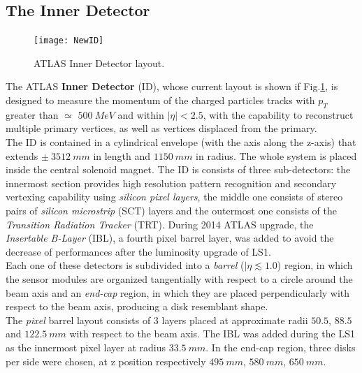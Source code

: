 \documentclass[a4paper,twoside,12pt]{article}
\begin{document}
\subsection{The Inner Detector}\label{sec:detector:tracker}

\begin{figure} [h]
\centering
	\texttt{[image: NewID]}
	\caption{ATLAS Inner Detector layout\cite{Aad:2008zzm}.}
	\label{fig:IDLayout}
\end{figure}

The ATLAS \textbf{Inner Detector} (ID), whose current layout is shown if Fig.\ref{fig:IDLayout}, is designed to measure the momentum of the
charged particles tracks with $p_{T}$ greater than $\simeq$ $500\ MeV$ and 
within $|\eta| < 2.5$, with the capability to reconstruct multiple primary vertices, as well as vertices displaced from the primary\cite{Aad:2008zzm}. \\

The ID is contained in a cylindrical envelope (with the axis along the z-axis) that extends
$\pm\ 3512\ mm$ in length and $1150\ mm$ in radius. The whole system is placed inside
the central solenoid magnet. The ID is consists of three sub-detectors: the innermost section provides
high resolution pattern recognition and secondary vertexing capability using \textit{silicon pixel layers}, the middle one consists of stereo pairs of \textit{silicon microstrip} (SCT) layers and the outermost one consists of the \textit{Transition Radiation Tracker} (TRT). During 2014 ATLAS upgrade, the \textit{Insertable B-Layer} (IBL), a fourth pixel barrel layer, was added to avoid the decrease of performances after the luminosity upgrade of LS1. \\

Each one of these detectors is subdivided into a \textit{barrel} ($|\eta \lesssim 1.0$) region, in which the sensor modules 
are organized tangentially with respect to a circle around the beam axis and an \textit{end-cap} region, in which they are placed perpendicularly with respect to the beam axis, producing
a disk resemblant shape.\\

The \textit{pixel} barrel layout consists of 3 layers placed at approximate radii $50.5$, $88.5$ and $122.5\ mm$ with respect to the beam 
axis. The IBL was added during the LS1 as the
innermost pixel layer at radius $33.5\ mm$. In the end-cap region, three disks per side were chosen,
at z position respectively $495\ mm$, $580\ mm$, $650\ mm$. \\
\end{document}
